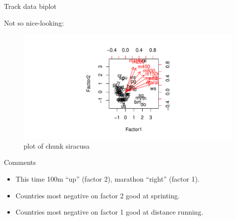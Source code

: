 \documentclass[ignorenonframetext,]{beamer}
\newenvironment{Shaded}{\begin{snugshade}}{\end{snugshade}}
\newcommand{\DataTypeTok}[1]{\textcolor[rgb]{0.13,0.29,0.53}{#1}}
\newcommand{\KeywordTok}[1]{\textcolor[rgb]{0.13,0.29,0.53}{\textbf{#1}}}
\newcommand{\NormalTok}[1]{#1}
\newcommand{\OperatorTok}[1]{\textcolor[rgb]{0.81,0.36,0.00}{\textbf{#1}}}
\begin{document}
\begin{frame}[fragile]{Track data biplot}
\protect\hypertarget{track-data-biplot}{}

Not so nice-looking:

\begin{Shaded}
\end{Shaded}

\begin{figure}
\centering
\includegraphics{figure/siracusa-1.pdf}
\caption{plot of chunk siracusa}
\end{figure}

\end{frame}

\begin{frame}{Comments}
\protect\hypertarget{comments-34}{}

\begin{itemize}
\item
  This time 100m ``up'' (factor 2), marathon ``right'' (factor 1).
\item
  Countries most negative on factor 2 good at sprinting.
\item
  Countries most negative on factor 1 good at distance running.
\end{itemize}

\end{frame}
\end{document}
